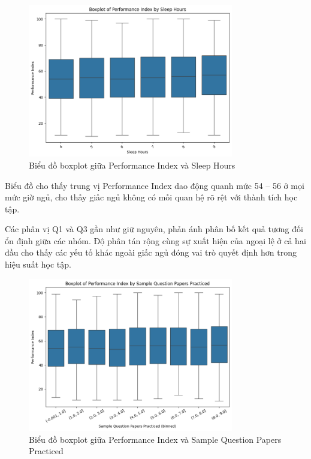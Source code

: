 \begin{figure}[H]
	\centering
	\includegraphics[width=0.8\textwidth]{images/eda/6.png}
	\caption{Biểu đồ boxplot giữa Performance Index và Sleep Hours}
\end{figure}

Biểu đồ cho thấy trung vị Performance Index dao động quanh mức 54 – 56 ở mọi mức giờ ngủ, cho thấy giấc ngủ không có mối quan hệ rõ rệt với thành tích học tập.

Các phân vị Q1 và Q3 gần như giữ nguyên, phản ánh phân bố kết quả tương đối ổn định giữa các nhóm. Độ phân tán rộng cùng sự xuất hiện của ngoại lệ ở cả hai đầu cho thấy các yếu tố khác ngoài giấc ngủ đóng vai trò quyết định hơn trong hiệu suất học tập.

\begin{figure}[H]
	\centering
	\includegraphics[width=0.8\textwidth]{images/eda/7.png}
	\caption{Biểu đồ boxplot giữa Performance Index và Sample Question Papers Practiced}
\end{figure}

